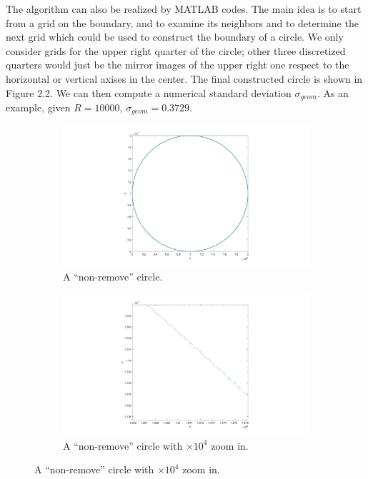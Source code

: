 \documentclass[letterpaper]{article}
\numberwithin{equation}{section} %
\numberwithin{figure}{section} %
\numberwithin{table}{section} %
\begin{document}
The algorithm can also be realized by MATLAB codes. The main idea is to start from a grid on the boundary, and to examine its neighbors and to determine the next grid which could be used to construct the boundary of a circle. We only consider grids for the upper right quarter of the circle; other three discretized quarters would just be the mirror images of the upper right one respect to the horizontal or vertical axises in the center. The final constructed circle is shown in Figure 2.2. We can then compute a numerical standard deviation $\sigma_{geom}$. As an example, given $R=10000$, $\sigma_{geom}=0.3729$.

\begin{figure}[htbp]
	\centering
	\begin{subfigure}[b]{0.6\textwidth}
		\includegraphics[width=\textwidth]{NonrmvCircle}
		\caption{A \enquote{non-remove} circle.}
		\label{NonrmvCircle}
	\end{subfigure}
	\begin{subfigure}[b]{0.6\textwidth}
		\includegraphics[width=\textwidth]{NonrmvCircleZI}
		\caption{A \enquote{non-remove} circle with $\times 10^4$ zoom in.}
		\label{NonrmvCircleZI}
	\end{subfigure}
	

\end{figure}
\end{document}
